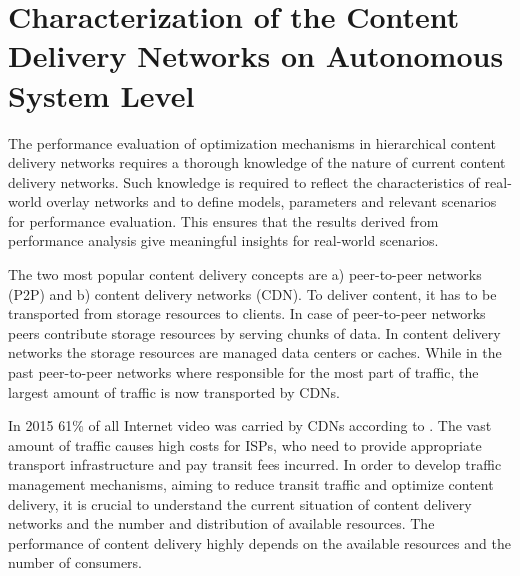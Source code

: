 \chapter{Characterization of the Content Delivery Networks on Autonomous System Level}\label{chap:aslevel}

The performance evaluation of optimization mechanisms in hierarchical content delivery networks requires a thorough knowledge of the nature of current content delivery networks.
Such knowledge is required to reflect the characteristics of real-world overlay networks and to define models, parameters and relevant scenarios for performance evaluation.
This ensures that the results derived from performance analysis give meaningful insights for real-world scenarios.

The two most popular content delivery concepts are a) peer-to-peer networks (P2P) and b) content delivery networks (CDN).
To deliver content, it has to be transported from storage resources to clients.
In case of peer-to-peer networks peers contribute storage resources by serving chunks of data.
In content delivery networks the storage resources are managed data centers or caches.
While in the past peer-to-peer networks where responsible for the most part of traffic, the largest amount of traffic is now transported by CDNs.

In 2015 61\% of all Internet video was carried by CDNs according to \cite{cisco2016}.
The vast amount of traffic causes high costs for ISPs, who need to provide appropriate transport infrastructure and pay transit fees incurred.
In order to develop traffic management mechanisms, aiming to reduce transit traffic and optimize content delivery, it is crucial to understand the current situation of content delivery networks and the number and distribution of available resources.
The performance of content delivery highly depends on the available resources and the number of consumers.


